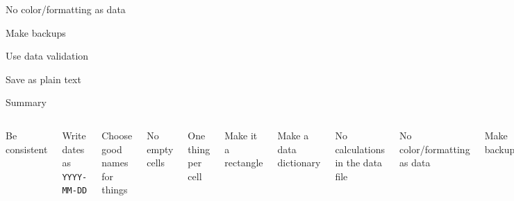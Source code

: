 \documentclass[aspectratio=169,12pt,t]{beamer}
\begin{document}
\begin{frame}[c]{No color/formatting as data}



  \note{
  }
\end{frame}



\begin{frame}[c]{Make backups}



  \note{
  }
\end{frame}



\begin{frame}[c]{Use data validation}



  \note{
  }
\end{frame}




\begin{frame}[c]{Save as plain text}



  \note{
  }
\end{frame}




\begin{frame}{Summary}

  \begin{columns}


    \bbe
  \item Be consistent
  \item Write dates as {\tt YYYY-MM-DD}
  \item Choose good names for things
  \item No empty cells
  \item One thing per cell
  \item Make it a rectangle
    \ee


    \bbe
    \addtocounter{enumi}{6}
  \item Make a data dictionary
  \item No calculations in the data file
  \item No color/formatting as data
  \item Make backups
  \item Use data validation
  \item Save as plain text
    \ee

    \end{columns}


  \note{

  }

\end{frame}
\end{document}
